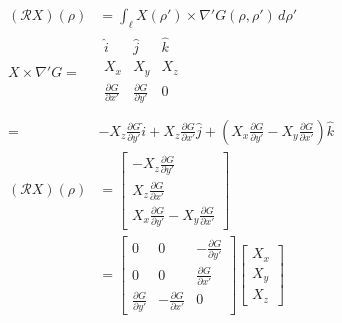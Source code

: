 \documentclass{article}
\newcommand{\X}{\mathbf{X}}
\newcommand{\0}{\varnothing}
\begin{document}
\begin{minipage}{0.45\textwidth}
\begin{align*}
    (\mathcal{R}X)(\rho) &= \int_{\ell} X(\rho') \times \nabla' G(\rho,\rho') \,d\rho'\\
    X \times \nabla' G = 
    &\begin{array}{|ccc|}
    \hat i & \hat j & \hat k\\
    X_x & X_y & X_z \\
    \frac{\partial G}{\partial x'} & \frac{\partial G}{\partial y'} & 0 \\
    \end{array}\\
    =  & - X_z \frac{\partial G}{\partial y'} \hat i + X_z \frac{\partial G}{\partial x'} \hat j + 
        \left(X_x \frac{\partial G}{\partial y'} - X_y \frac{\partial G}{\partial x'}\right) \hat k\\
    (\mathcal{R}X)(\rho) &=  
      \left[ \begin{array}{c} - X_z \frac{\partial G}{\partial y'}\\ X_z \frac{\partial G}{\partial x'} \\X_x \frac{\partial G}{\partial y'} - X_y \frac{\partial G}{\partial x'}   \end{array} \right]\\
        &= \left[ \begin{array}{ccc} 0 & 0 & - \frac{\partial G}{\partial y'}\\ 
                            0 & 0 &\frac{\partial G}{\partial x'}\\ 
                            \frac{\partial G}{\partial y'} &-\frac{\partial G}{\partial x'} &0 \end{array} \right]
        \left[ \begin{array}{c} 
        X_x \\ X_y \\ X_z \end{array} \right]
\end{align*}
\end{minipage}
\end{document}
